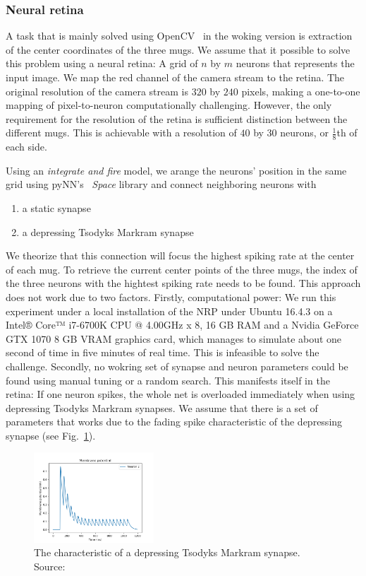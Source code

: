 \documentclass[conference]{IEEEtran}
\begin{document}
\subsubsection*{Neural retina}

A task that is mainly solved using OpenCV~\cite{opencv_library} in the woking version is extraction of the center coordinates of the three mugs. 
We assume that it possible to solve this problem using a neural retina: A grid of $n$ by $m$ neurons that represents the input image. We map the red channel of the camera stream to the retina. The original resolution of the camera stream is $320$ by $240$ pixels, making a one-to-one mapping of pixel-to-neuron computationally challenging. However, the only requirement for the resolution of the retina is sufficient distinction between the different mugs. 
This is achievable with a resolution of $40$ by $30$ neurons, or $\frac{1}{8}$th of each side.

Using an \textit{integrate and fire} model, we arange the neurons' position in the same grid using pyNN's~\cite{pynn} \textit{Space} library and connect neighboring neurons with \begin{enumerate}
\item a static synapse
\item a depressing Tsodyks Markram synapse
\end{enumerate}
We theorize that this connection will focus the highest spiking rate at the center of each mug. To retrieve the current center points of the three mugs, the index of the three neurons with the hightest spiking rate needs to be found.
This approach does not work due to two factors. Firstly, computational power: We run this experiment under a local installation of the NRP under Ubuntu 16.4.3 on a Intel® Core™ i7-6700K CPU @ 4.00GHz x 8, 16 GB RAM and a Nvidia GeForce GTX 1070 8 GB VRAM graphics card, which manages to simulate about one second of time in five minutes of real time. This is infeasible to solve the challenge.
Secondly, no wokring set of synapse and neuron parameters could be found using manual tuning or a random search. 
This manifests itself in the retina: If one neuron spikes, the whole net is overloaded immediately when using depressing Tsodyks Markram synapses. We assume that 
there is a set of parameters that works due to the fading spike characteristic of the depressing synapse (see Fig.~\ref{fig:markram}).

\begin{figure}[!t]
	\centering
	\includegraphics[width=0.4\textwidth]{logos/tsodyks_depressing}
	\caption{The characteristic of a depressing Tsodyks Markram synapse. Source:~\cite{nestweb}}
	\label{fig:markram}
\end{figure}
\end{document}
